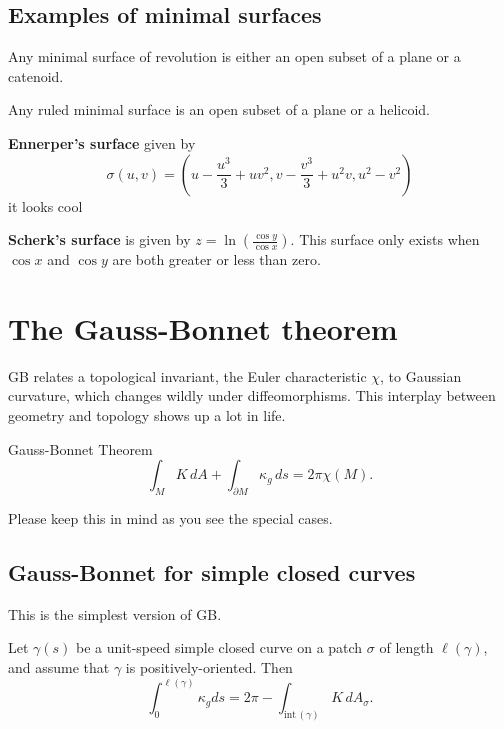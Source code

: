 \subsection{Examples of minimal surfaces}
\begin{prop}
    Any minimal surface of revolution is either an open subset of a plane or a catenoid.
\end{prop}
\begin{prop}
    Any ruled minimal surface is an open subset of a plane or a helicoid.
\end{prop}
\begin{example}
    \textbf{Ennerper's surface} given by \[
        \sigma(u,v)= \left( u- \frac{u^3}{3}+uv^2, v-\frac{v^3}{3}+u^2v, u^2-v^2 \right) 
    \] it looks cool
\end{example}
\begin{example}
    \textbf{Scherk's surface} is given by $z=\ln \left( \frac{\cos y}{ \cos x} \right) $. This surface only exists when $\cos x$ and $\cos y$ are both greater or less than zero.
\end{example}

\section{The Gauss-Bonnet theorem}
GB relates a topological invariant, the Euler characteristic $\chi$, to Gaussian curvature, which changes wildly under diffeomorphisms. This interplay between geometry and topology shows up a lot in life.
\begin{namedthm}{Gauss-Bonnet Theorem} 
    \[
        \int_M K \,dA+\int_{\partial M}\kappa_g \,ds=2\pi \chi(M).
    \] 
\end{namedthm}
Please keep this in mind as you see the special cases.
\subsection{Gauss-Bonnet for simple closed curves}
  This is the simplest version of GB.
  \begin{theorem}
      Let $\gamma (s)$ be a unit-speed simple closed curve on a patch $\sigma$ of length $\ell(\gamma )$, and assume that $\gamma $ is positively-oriented. Then \[
          \int_{0}^{\ell (\gamma )} \kappa_g ds=2\pi- \int _{\text{int} \, (\gamma )}K\, d A_{\sigma}.
      \] 
  \end{theorem}

